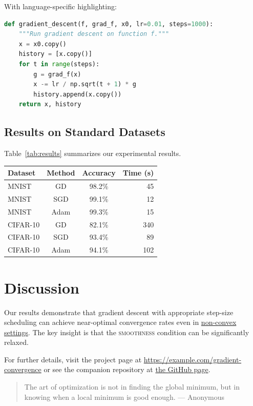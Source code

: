 \documentclass[11pt]{article}
\begin{document}
With language-specific highlighting:

\begin{lstlisting}[language=Python]
def gradient_descent(f, grad_f, x0, lr=0.01, steps=1000):
    """Run gradient descent on function f."""
    x = x0.copy()
    history = [x.copy()]
    for t in range(steps):
        g = grad_f(x)
        x -= lr / np.sqrt(t + 1) * g
        history.append(x.copy())
    return x, history
\end{lstlisting}

\subsection{Results on Standard Datasets}

Table~\ref{tab:results} summarizes our experimental results.

\begin{tabular}{|l|c|c|r|}
\hline
Dataset & Method & Accuracy & Time (s) \\
\hline
MNIST & GD & 98.2\% & 45 \\
MNIST & SGD & 99.1\% & 12 \\
MNIST & Adam & 99.3\% & 15 \\
\hline
CIFAR-10 & GD & 82.1\% & 340 \\
CIFAR-10 & SGD & 93.4\% & 89 \\
CIFAR-10 & Adam & 94.1\% & 102 \\
\hline
\end{tabular}

\section{Discussion}

Our results demonstrate that gradient descent with appropriate step-size
scheduling can achieve near-optimal convergence rates even in
\underline{non-convex settings}. The key insight is that the
\textsc{smoothness} condition can be significantly relaxed.

For further details, visit the project page at
\url{https://example.com/gradient-convergence} or see the companion
repository at \href{https://github.com/example/gradient-descent}{the
GitHub page}.

\begin{quote}
The art of optimization is not in finding the global minimum, but in
knowing when a local minimum is good enough. --- Anonymous
\end{quote}
\end{document}
